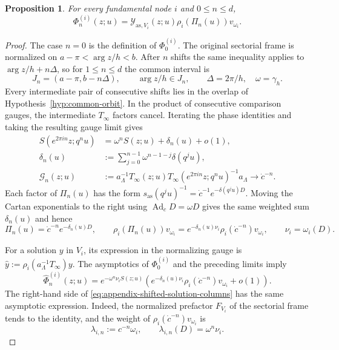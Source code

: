 \documentclass[11pt,leqno]{amsart}
\numberwithin{equation}{section}
\theoremstyle{plain}
\newtheorem{proposition}[theorem]{Proposition}
\theoremstyle{definition}
\theoremstyle{plain}
\theoremstyle{definition}
\theoremstyle{remark}
\begin{document}
\begin{proposition}\label{prop:appendix-shifted-solution-columns}
For every fundamental node $i$ and $0\le n\le d$,
\begin{equation}\label{eq:appendix-shifted-solution-columns}
 \Phi_n^{(i)}(z;u)
 =\mathcal Y_{\mathrm{as},V_i}(z;u)
       \rho_i(\Pi_n(u))v_{\omega_i}.
\end{equation}
\end{proposition}
\begin{proof}
The case $n=0$ is the definition of $\Phi_0^{(i)}$.  The original sectorial frame is normalized on $a-\pi<\arg z/h<b$.  After $n$ shifts the same inequality applies to $\arg z/h+n\Delta$, so for $1\le n\le d$ the common interval is
\[
 J_n=(a-\pi,b-n\Delta),\qquad
 \arg z/h\in J_n,\qquad
 \Delta=2\pi/h,\quad \omega=\gamma_h.
\]
Every intermediate pair of consecutive shifts lies in the overlap of Hypothesis~\ref{hyp:common-orbit}.  In the product of consecutive comparison gauges, the intermediate $T_\infty$ factors cancel.  Iterating the phase identities and taking the resulting gauge limit gives
\[
 \begin{aligned}
 S(e^{2\pi in}z;q^nu)
   &=\omega^nS(z;u)+\delta_n(u)+o(1),\\
 \delta_n(u)&:=\sum_{j=0}^{n-1}\omega^{n-1-j}\delta(q^ju),\\
 \mathcal G_n(z;u)&:=a_\Lambda^{-1}T_\infty(z;u)
       T_\infty(e^{2\pi in}z;q^nu)^{-1}a_\Lambda
       \longrightarrow\dot c^{-n}.
 \end{aligned}
\]
Each factor of $\Pi_n(u)$ has the form $s_{\mathrm{as}}(q^ju)^{-1}=\dot c^{-1}e^{-\delta(q^ju)D}$.  Moving the Cartan exponentials to the right using $\operatorname{Ad}_{\dot c}D=\omega D$ gives the same weighted sum $\delta_n(u)$ and hence
\begin{equation}\label{eq:appendix-Coxeter-column-factor}
 \Pi_n(u)=\dot c^{-n}e^{-\delta_n(u)D},
 \qquad
 \rho_i(\Pi_n(u))v_{\omega_i}
 =e^{-\delta_n(u)\nu_i}\rho_i(\dot c^{-n})v_{\omega_i},
 \qquad \nu_i=\omega_i(D).
\end{equation}

For a solution $y$ in $V_i$, its expression in the normalizing gauge is
$\widehat y:=\rho_i(a_\Lambda^{-1}T_\infty)y$.
The asymptotics of $\Phi_0^{(i)}$ and the preceding limits imply
\begin{equation}\label{eq:appendix-shifted-solution-asymptotics}
 \widehat\Phi_n^{(i)}(z;u)
 =e^{-\omega^n\nu_iS(z;u)}
    \left(e^{-\delta_n(u)\nu_i}
          \rho_i(\dot c^{-n})v_{\omega_i}+o(1)\right).
\end{equation}
The right-hand side of \eqref{eq:appendix-shifted-solution-columns} has the same asymptotic expression.  Indeed, the normalized prefactor $F_{V_i}$ of the sectorial frame tends to the identity, and the weight of $\rho_i(\dot c^{-n})v_{\omega_i}$ is
\[
 \lambda_{i,n}:=c^{-n}\omega_i,\qquad
 \lambda_{i,n}(D)=\omega^n\nu_i.
\]


\end{proof}
\end{document}
